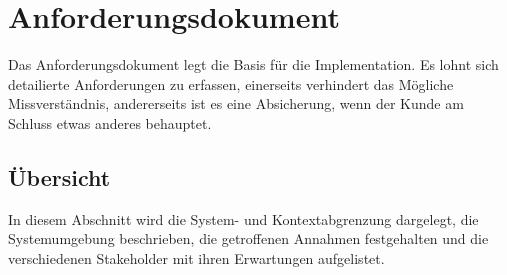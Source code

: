 %
%

\chapter{Anforderungsdokument}\label{chap.anforderungsdokument}

Das Anforderungsdokument legt die Basis für die Implementation. Es lohnt sich detailierte Anforderungen zu erfassen, einerseits verhindert das Mögliche Missverständnis, andererseits ist es eine Absicherung, wenn der Kunde am Schluss etwas anderes behauptet.

\section{Übersicht}\label{anf_uebersicht}

In diesem Abschnitt  wird die System- und Kontextabgrenzung dargelegt, die Systemumgebung beschrieben, die getroffenen Annahmen festgehalten und die verschiedenen Stakeholder mit ihren Erwartungen aufgelistet.

